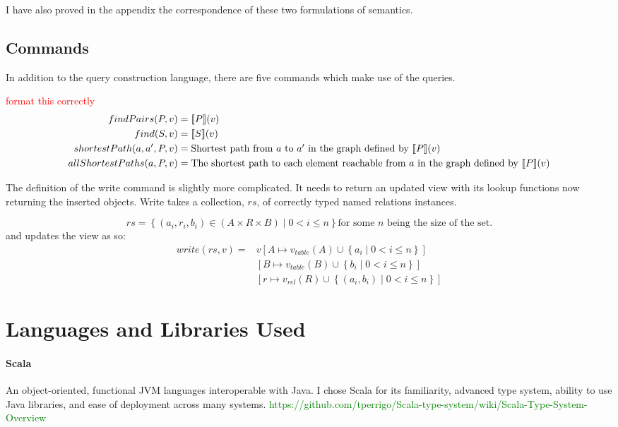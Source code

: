 \documentclass[12pt,a4paper,twoside,openright]{report}
\newcommand\todo[1]{\textcolor{red}{#1}}
\newcommand\toReference[1]{\textcolor{green}{#1}}
\newcommand{\db}[1]{{\bf [\![}#1{\bf ]\!]}}
\newcommand{\deno}[1]{\db{#1}(v)}
\newcommand{\setComp}[2]{\left\lbrace #1 \mid #2 \right\rbrace}
\begin{document}
   I have also proved in the appendix the correspondence of these two formulations of semantics.
\subsection{Commands}
In addition to the query construction language, there are five commands which make use of the queries.

\todo{format this correctly}
\[\label{CommandSemantics}
\begin{split}
findPairs(P, v) &= \deno{P}\\
find(S, v) &=  \deno{S}\\
shortestPath(a, a', P, v) &= \mbox{Shortest path from $a$ to $a'$ in the graph defined by $\deno{P}$}\\
allShortestPaths(a, P, v) &= \mbox{The shortest path to each element reachable from $a$ in the graph defined by $\deno{P}$}\\
\end{split}\]

The definition of the write command is slightly more complicated. It needs to return an updated view with its lookup functions now returning the inserted objects. Write takes a collection, $rs$, of correctly typed named relations instances.


\[rs = \setComp{(a_i, r_i, b_i) \in (A \times R \times B)}{0 < i \leqslant n} \mbox{for some $n$ being the size of the set.}\]
and updates the view as so: 
\begin{equation}
\begin{split}
write(rs, v) = &v\left[A \mapsto v_{table}(A) \cup \setComp{a_i}{0 < i \leqslant n}\right]\\
& \left[B \mapsto v_{table}(B) \cup \setComp{b_i}{0 < i \leqslant n}\right]\\
& \left[r \mapsto v_{rel}(R) \cup \setComp{(a_i, b_i)}{0 < i \leqslant n}\right] 
\end{split}
\end{equation}


\section{Languages and Libraries Used}
\paragraph{Scala} An object-oriented, functional JVM languages interoperable with Java. I chose Scala for its familiarity, advanced type system, ability to use Java libraries, and ease of deployment across many systems. \toReference{https://github.com/tperrigo/Scala-type-system/wiki/Scala-Type-System-Overview}
\end{document}
